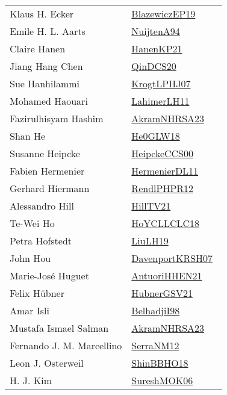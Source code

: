 {\begin{longtable}{p{4cm}p{20cm}}
Klaus H. Ecker & \href{}{BlazewiczEP19}~\cite{BlazewiczEP19}\\
Emile H. L. Aarts & \href{works/NuijtenA94.pdf}{NuijtenA94}~\cite{NuijtenA94}\\
Claire Hanen & \href{works/HanenKP21.pdf}{HanenKP21}~\cite{HanenKP21}\\
Jiang Hang Chen & \href{works/QinDCS20.pdf}{QinDCS20}~\cite{QinDCS20}\\
Sue Hanhilammi & \href{works/KrogtLPHJ07.pdf}{KrogtLPHJ07}~\cite{KrogtLPHJ07}\\
Mohamed Haouari & \href{works/LahimerLH11.pdf}{LahimerLH11}~\cite{LahimerLH11}\\
Fazirulhisyam Hashim & \href{works/AkramNHRSA23.pdf}{AkramNHRSA23}~\cite{AkramNHRSA23}\\
Shan He & \href{works/He0GLW18.pdf}{He0GLW18}~\cite{He0GLW18}\\
Susanne Heipcke & \href{works/HeipckeCCS00.pdf}{HeipckeCCS00}~\cite{HeipckeCCS00}\\
Fabien Hermenier & \href{works/HermenierDL11.pdf}{HermenierDL11}~\cite{HermenierDL11}\\
Gerhard Hiermann & \href{works/RendlPHPR12.pdf}{RendlPHPR12}~\cite{RendlPHPR12}\\
Alessandro Hill & \href{works/HillTV21.pdf}{HillTV21}~\cite{HillTV21}\\
Te{-}Wei Ho & \href{works/HoYCLLCLC18.pdf}{HoYCLLCLC18}~\cite{HoYCLLCLC18}\\
Petra Hofstedt & \href{works/LiuLH19.pdf}{LiuLH19}~\cite{LiuLH19}\\
John Hou & \href{works/DavenportKRSH07.pdf}{DavenportKRSH07}~\cite{DavenportKRSH07}\\
Marie{-}Jos{\'{e}} Huguet & \href{works/AntuoriHHEN21.pdf}{AntuoriHHEN21}~\cite{AntuoriHHEN21}\\
Felix H{\"{u}}bner & \href{works/HubnerGSV21.pdf}{HubnerGSV21}~\cite{HubnerGSV21}\\
Amar Isli & \href{works/BelhadjiI98.pdf}{BelhadjiI98}~\cite{BelhadjiI98}\\
Mustafa Ismael Salman & \href{works/AkramNHRSA23.pdf}{AkramNHRSA23}~\cite{AkramNHRSA23}\\
Fernando J. M. Marcellino & \href{works/SerraNM12.pdf}{SerraNM12}~\cite{SerraNM12}\\
Leon J. Osterweil & \href{works/ShinBBHO18.pdf}{ShinBBHO18}~\cite{ShinBBHO18}\\
H. J. Kim & \href{works/SureshMOK06.pdf}{SureshMOK06}~\cite{SureshMOK06}\\

\end{longtable}}

